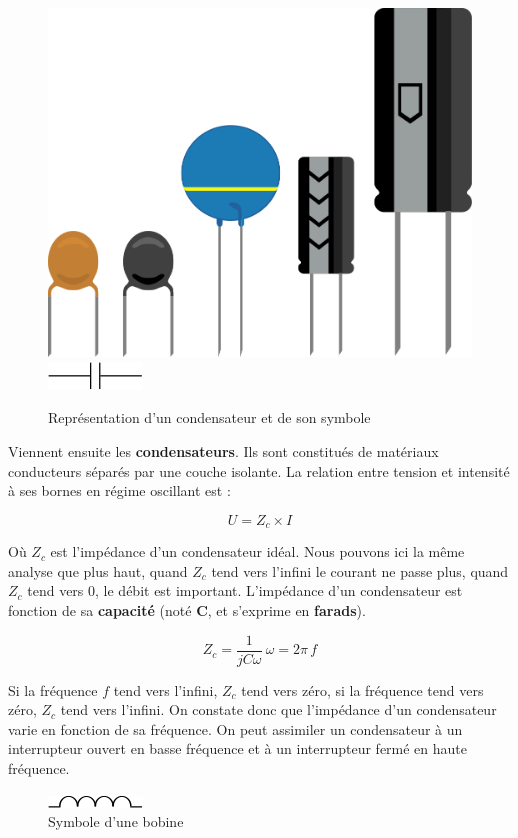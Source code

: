 \documentclass[
]{book}
\begin{document}
\begin{figure}

{\centering \includegraphics[width=0.25\linewidth]{_resources/diagrams/capa} \includegraphics[width=0.25\linewidth]{_resources/diagrams/capa_sym} 

}

\caption{Représentation d'un condensateur et de son symbole}\label{fig:unnamed-chunk-15}
\end{figure}

Viennent ensuite les \textbf{condensateurs}. Ils sont constitués de matériaux conducteurs séparés par une couche isolante. La relation entre tension et intensité à ses bornes en régime oscillant est :

\[ U = Z_c \times I \]

Où \(Z_c\) est l'impédance d'un condensateur idéal. Nous pouvons ici la même analyse que plus haut, quand \(Z_c\) tend vers l'infini le courant ne passe plus, quand \(Z_c\) tend vers 0, le débit est important. L'impédance d'un condensateur est fonction de sa \textbf{capacité} (noté \textbf{C}, et s'exprime en \textbf{farads}).

\[ Z_c = \frac{1}{jC\omega} \> \omega = 2 \pi \, f\]

Si la fréquence \(f\) tend vers l'infini, \(Z_c\) tend vers zéro, si la fréquence tend vers zéro, \(Z_c\) tend vers l'infini. On constate donc que l'impédance d'un condensateur varie en fonction de sa fréquence. On peut assimiler un condensateur à un interrupteur ouvert en basse fréquence et à un interrupteur fermé en haute fréquence.

\begin{figure}

{\centering \includegraphics[width=0.25\linewidth]{_resources/diagrams/inductor_sym} 

}

\caption{Symbole d'une bobine}\label{fig:unnamed-chunk-16}
\end{figure}
\end{document}
